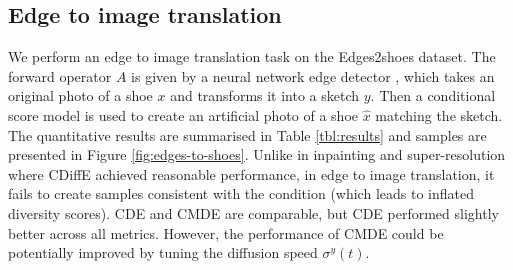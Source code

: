 \subsection{Edge to image translation}
We perform an edge to image translation task on the Edges2shoes dataset. The forward operator $A$ is given by a neural network edge detector \cite{xie2015edges}, which takes an original photo of a shoe $x$ and transforms it into a sketch $y$. Then a conditional score model is used to create an artificial photo of a shoe $\hat{x}$ matching the sketch. The quantitative results are summarised in Table \ref{tbl:results} and samples are presented in Figure \ref{fig:edges-to-shoes}. Unlike in inpainting and super-resolution where CDiffE achieved reasonable performance, in edge to image translation, it fails to create samples consistent with the condition (which leads to inflated diversity scores). CDE and CMDE are comparable, but CDE performed slightly better across all metrics. However, the performance of CMDE could be potentially improved by  tuning the diffusion speed $\sigma^y(t)$.

